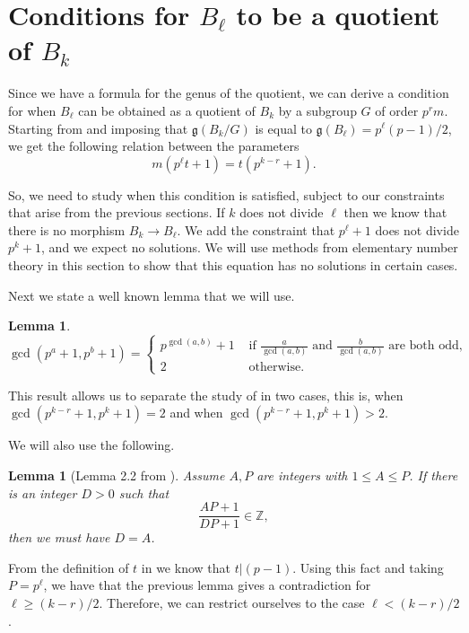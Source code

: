 \documentclass[oneside,a4paper,12pt]{article}
\newcommand{\Z}{{\mathbb{Z}}} %
\theoremstyle{plain} %
\newtheorem{lemma}[theorem]{Lemma}
\theoremstyle{definition} %
\begin{document}
 
\section{Conditions for $B_{\ell}$ to be a quotient of $B_k$}\label{sec: Cond quot}

Since we have a formula for the genus of the quotient, 
we can derive a condition for when $B_\ell$ can be obtained as a quotient of $B_k$ by a subgroup $G$ of order $p^rm$. Starting from  and imposing that $\mathfrak{g}(B_k/G)$ is equal to $ \mathfrak{g}(B_\ell)= p^\ell(p-1)/2$, we get the following relation
between the parameters
\begin{equation}\label{eq: B_kB_l}
    m(p^{\ell}t+1)= t(p^{k-r}+1).
\end{equation}

So, we need to study when this condition is satisfied, subject to our constraints that arise from the previous sections.
If $k$ does not divide $\ell$ then we know that there is no morphism
$B_k \longrightarrow B_\ell$.
We add the constraint that $p^\ell +1$ does not divide $p^k+1$, and we expect
no solutions. 
We will use methods from elementary number theory in
this section to show that this equation  has no solutions in certain cases.



Next we  state a well known lemma that we will use.

\begin{lemma}\label{gcd_p_plus}
$$\gcd(p^a+1,p^b+1)=
\begin{cases}
    p^{\gcd(a, b)}+1 &\text{ if } \frac{a}{\gcd(a, b)} \text{ and }  
    \frac{b}{\gcd(a, b)} \text{ are both odd}, \\
    2  &\text{ otherwise.}
\end{cases}
$$
\end{lemma}

This result allows us to separate the study of  in two cases, this is, when $\gcd(p^{k-r}+1, p^k+1)=2$ and when $\gcd(p^{k-r}+1, p^k+1)>2$. 

We will also use the following.

\begin{lemma}[Lemma 2.2 from \cite{Ramzy2022APT}]\label{apdp}
    Assume $A, P$ are integers with $1\leq A \leq P$. If there is an integer $D>0$ such that 
    \[
    \frac{AP+1}{DP+1} \in \Z,
    \]
    then we must have $D=A$.
\end{lemma}

From the definition of $t$ in  we know that $t|(p-1)$. Using this fact and taking $P=p^\ell$,  we have that the previous lemma gives a contradiction for $\ell \geq (k-r)/2$. Therefore, we can restrict ourselves to the case $\ell < (k-r)/2$.
\end{document}

